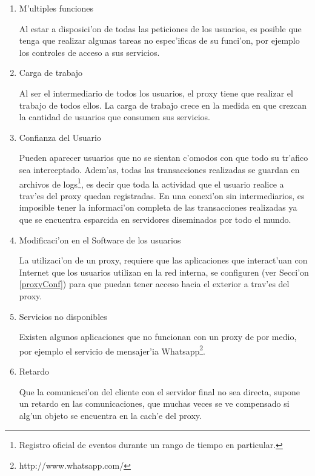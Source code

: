 \begin{enumerate}
\item M'ultiples funciones

Al estar a disposici'on de todas las peticiones de los usuarios, es posible que tenga que realizar algunas tareas no espec'ificas de su funci'on, por ejemplo los controles de acceso a sus servicios.
\item Carga de trabajo

Al ser el intermediario de todos los usuarios, el proxy tiene que realizar el trabajo de todos ellos. La carga de trabajo crece en la medida en que crezcan la cantidad de usuarios que consumen sus servicios.
\item Confianza del Usuario

Pueden aparecer usuarios que no se sientan c'omodos con que todo su tr'afico sea interceptado. Adem'as, todas las transacciones realizadas se guardan en archivos de logs\footnote{Registro oficial de eventos durante un rango de tiempo en particular.}, es decir que toda la actividad que el usuario realice a trav'es del proxy quedan registradas. En una conexi'on sin intermediarios, es imposible tener la informaci'on completa de las transacciones realizadas ya que se encuentra esparcida en servidores diseminados por todo el mundo.
\item Modificaci'on en el Software de los usuarios

La utilizaci'on de un proxy, requiere que las aplicaciones que interact'uan con Internet que los usuarios utilizan en la red interna, se configuren (ver Secci'on \ref{proxyConf}) para que puedan tener acceso hacia el exterior a trav'es del proxy. 
\item Servicios no disponibles

Existen algunos aplicaciones que no funcionan con un proxy de por medio, por ejemplo el servicio de mensajer'ia Whatsapp\footnote{http://www.whatsapp.com/}.
\item Retardo

Que la comunicaci'on del cliente con el servidor final no sea directa, supone un retardo en las comunicaciones, que muchas veces se ve compensado si alg'un objeto se encuentra en la cach'e del proxy.
\end{enumerate}

